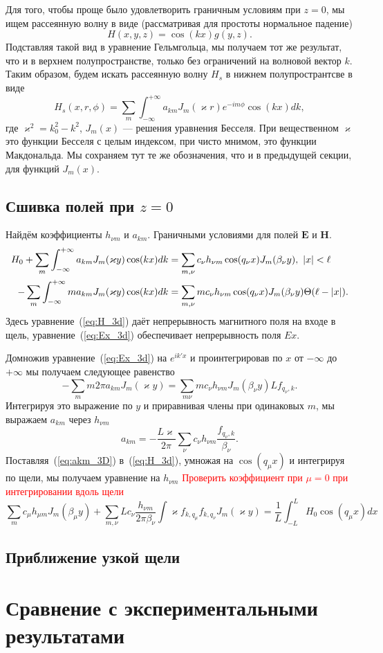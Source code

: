 Для того, чтобы проще было удовлетворить граничным условиям при $z = 0$,
мы ищем рассеянную волну в виде (рассматривая для простоты нормальное падение)
$$
    H(x,y,z) = \cos(k x)g(y,z).
$$
Подставляя такой вид в уравнение Гельмгольца, мы получаем тот же результат, что и в верхнем полупространстве, только без ограничений на 
волновой вектор $k$. Таким образом, будем искать рассеянную волну $H_s$ в нижнем полупространтсве в виде
\begin{equation}
    H_{s}(x,r,\phi) = \sum_{m} \int_{-\infty}^{+\infty} a_{km} J_m(\varkappa r) e^{-i m \phi} \cos(k x) dk,
\end{equation}
где $\varkappa^2 = k_0^2 - k^2$, $J_m(x)$ --- решения уравнения Бесселя. При вещественном $\varkappa$ это функции Бесселя с целым индексом, при чисто мнимом, это функции Макдональда. Мы сохраняем тут те же обозначения, что и в предыдущей секции, для функций $J_m(x)$.

\section{Сшивка полей при $z = 0$}
Найдём коэффициенты $h_{\nu m}$ и $a_{km}$. Граничными условиями для полей $\mathbf{E}$ и $\mathbf{H}$. 
\begin{align}
    H_0 +  \sum_{m} \int_{-\infty}^{+\infty} a_{km} J_m(\varkappa y) \cos(k x) dk &= \sum_{m,\nu}c_\nu h_{\nu m}\cos(q_\nu x) J_m(\beta_\nu y), \ \lvert x\rvert < \ell\label{eq:H_3d}  \\
    -\sum_{m} \int_{-\infty}^{+\infty} m a_{km} J_m(\varkappa y) \cos(k x) dk &= \sum_{m,\nu}m c_\nu h_{\nu m}\cos(q_\nu x) J_m(\beta_\nu y)\Theta(\ell- \lvert x\rvert)  \label{eq:Ex_3d}.
\end{align}
Здесь уравнение~(\ref{eq:H_3d}) даёт непрерывность магнитного поля на входе в щель, уравнение~(\ref{eq:Ex_3d}) обеспечивает непрерывность поля $Ex$.

Домножив уравнение~(\ref{eq:Ex_3d}) на $e^{i k' x}$ и проинтегрировав по $x$ от $-\infty$ до $+\infty$ мы получаем следующее равенство
\begin{equation}
    -\sum_m m 2\pi a_{km} J_m(\varkappa y) = \sum_{m \nu} m c_\nu h_{\nu m} J_m(\beta_\nu y) L f_{q_\nu,k}.
\end{equation}
Интегрируя это выражение по $y$ и приравнивая члены при одинаковых $m$, мы выражаем $a_{km}$ через $h_{\nu m}$
\begin{equation}
    a_{km} = -\frac{L\varkappa}{2 \pi} \sum_{\nu} c_\nu h_{\nu m} \frac{f_{q_\nu,k}}{\beta_\nu}.
    \label{eq:akm_3D}
\end{equation}
Поставляя~(\ref{eq:akm_3D}) в~(\ref{eq:H_3d}), умножая на $\cos(q_\mu x)$ и интегрируя по щели, мы получаем уравнение на $h_{\nu m}$ \textcolor{red}{Проверить коэффициент при $\mu =0$ при интегрировании вдоль щели}
\begin{equation}
    \sum_m c_\mu h_{\mu m} J_m(\beta_\mu y) + \sum_{m,\nu} L c_\nu \frac{h_{\nu m}}{2\pi \beta_\nu} \int \varkappa f_{k,q_\mu}f_{k,q_\nu} J_m(\varkappa y) = \frac{1}{L}\int_{-L}^{L} H_0 \cos(q_\mu x) dx 
\end{equation}
\section{Приближение узкой щели}

\chapter{Сравнение с экспериментальными результатами}
